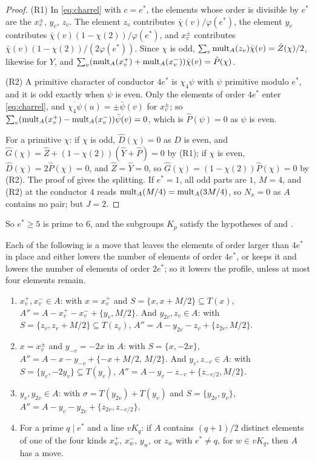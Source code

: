 \begin{proof}
(R1) In \eqref{eq:charrel} with $c=e^{*}$, the elements whose order is
divisible by $e^{*}$ are the $x^{\pm}_{v}$, $y_{v}$, $z_{v}$. The element
$z_{v}$ contributes $\bar\chi(v)/\varphi(e^{*})$, the element $y_{v}$
contributes $\bar\chi(v)(1-\chi(2))/\varphi(e^{*})$, and $x^{\pm}_{v}$
contributes $\bar\chi(v)(1-\chi(2))/(2\varphi(e^{*}))$. Since $\chi$ is odd,
$\sum_{v}\operatorname{mult}_{A}(z_{v})\bar\chi(v)=\hat Z(\chi)/2$, likewise for $Y$, and
$\sum_{v}(\operatorname{mult}_{A}(x^{+}_{v})+\operatorname{mult}_{A}(x^{-}_{v}))\bar\chi(v)=\hat
P(\chi)$.

(R2) A primitive character of conductor $4e^{*}$ is $\chi_{4}\psi$ with
$\psi$ primitive modulo $e^{*}$, and it is odd exactly when $\psi$ is even.
Only the elements of order $4e^{*}$ enter \eqref{eq:charrel}, and
$\overline{\chi_{4}\psi}(u)=\pm\bar\psi(v)$ for $x^{\pm}_{v}$; so
$\sum_{v}(\operatorname{mult}_{A}(x^{+}_{v})-\operatorname{mult}_{A}(x^{-}_{v}))\bar\psi(v)=0$, which is
$\hat P(\psi)=0$ as $\psi$ is even.

For a primitive $\chi$: if $\chi$ is odd, $\hat D(\chi)=0$ as $D$ is even, and
$\hat G(\chi)=\hat Z+(1-\chi(2))(\hat Y+\hat P)=0$ by (R1); if $\chi$ is even,
$\hat D(\chi)=2\hat P(\chi)=0$, and $\hat Z=\hat Y=0$, so $\hat
G(\chi)=(1-\chi(2))\hat P(\chi)=0$ by (R2). The proof of 
gives the splitting. If $e^{*}=1$, all odd parts are $1$, $M=4$, and (R2) at
the conductor $4$ reads $\operatorname{mult}_{A}(M/4)=\operatorname{mult}_{A}(3M/4)$, so $N_{x}=0$ as $A$
contains no pair; but $J=2$.
\end{proof}

So $e^{*}\ge5$ is prime to $6$, and the subgroups $K_{p}$ satisfy the
hypotheses of  and .

\begin{lemma}\label{lem:fourmoves}
Each of the following is a move that leaves the elements of order larger
than $4e^{*}$ in place and either lowers the number of elements of order
$4e^{*}$, or keeps it and lowers the number of elements of order $2e^{*}$;
so it lowers the profile, unless at most four elements remain.
\begin{enumerate}[label=\textup{(\alph*)}]
\item $x^{+}_{v},x^{-}_{v}\in A$: with $x=x^{+}_{v}$ and
$S=\{x,x+M/2\}\subseteq T(x)$, $A''=A-x^{+}_{v}-x^{-}_{v}+\{y_{v},M/2\}$.
And $y_{2v},z_{v}\in A$: with $S=\{z_{v},z_{v}+M/2\}\subseteq T(z_{v})$,
$A''=A-y_{2v}-z_{v}+\{z_{2v},M/2\}$.
\item $x=x^{\pm}_{v}$ and $y_{-v}=-2x$ in $A$: with $S=\{x,-2x\}$,
$A''=A-x-y_{-v}+\{-x+M/2,\,M/2\}$. And $y_{v},z_{-v}\in A$: with
$S=\{y_{v},-2y_{v}\}\subseteq T(y_{v})$, $A''=A-y_{v}-z_{-v}+\{z_{-v/2},M/2\}$.
\item $y_{v},y_{2v}\in A$: with $\sigma=T(y_{2v})+T(y_{v})$ and
$S=\{y_{2v},y_{v}\}$, $A''=A-y_{v}-y_{2v}+\{z_{2v},z_{-v/2}\}$.
\item For a prime $q\mid e^{*}$ and a line $vK_{q}$: if $A$ contains
$(q+1)/2$ distinct elements of one of the four kinds $x^{+}_{w}$, $x^{-}_{w}$,
$y_{w}$, or $z_{w}$ with $e^{*}\ne q$, for $w\in vK_{q}$, then $A$ has a move.
\end{enumerate}
\end{lemma}

